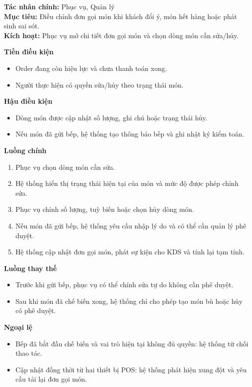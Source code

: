 \documentclass[11pt,a4paper]{article}
\begin{document}
    \begin{usecasebox}[title={UC-ORD-04 --- Sửa hoặc hủy dòng món}]
    \textbf{Tác nhân chính:} Phục vụ, Quản lý\\
    \textbf{Mục tiêu:} Điều chỉnh đơn gọi món khi khách đổi ý, món hết hàng hoặc phát sinh sai sót.\\
    \textbf{Kích hoạt:} Phục vụ mở chi tiết đơn gọi món và chọn dòng món cần sửa/hủy.

    \medskip
    \textbf{Tiền điều kiện}
    \begin{itemize}[leftmargin=1.8em]
  \item Order đang còn hiệu lực và chưa thanh toán xong.
  \item Người thực hiện có quyền sửa/hủy theo trạng thái món.
\end{itemize}

    \textbf{Hậu điều kiện}
    \begin{itemize}[leftmargin=1.8em]
  \item Dòng món được cập nhật số lượng, ghi chú hoặc trạng thái hủy.
  \item Nếu món đã gửi bếp, hệ thống tạo thông báo bếp và ghi nhật ký kiểm toán.
\end{itemize}

    \textbf{Luồng chính}
    \begin{enumerate}[leftmargin=1.8em]
  \item Phục vụ chọn dòng món cần sửa.
  \item Hệ thống hiển thị trạng thái hiện tại của món và mức độ được phép chỉnh sửa.
  \item Phục vụ chỉnh số lượng, tuỳ biến hoặc chọn hủy dòng món.
  \item Nếu món đã gửi bếp, hệ thống yêu cầu nhập lý do và có thể cần quản lý phê duyệt.
  \item Hệ thống cập nhật đơn gọi món, phát sự kiện cho KDS và tính lại tạm tính.
\end{enumerate}

    \textbf{Luồng thay thế}
    \begin{itemize}[leftmargin=1.8em]
  \item Trước khi gửi bếp, phục vụ có thể chỉnh sửa tự do không cần phê duyệt.
  \item Sau khi món đã chế biến xong, hệ thống chỉ cho phép tạo món bù hoặc hủy có phê duyệt.
\end{itemize}

    \textbf{Ngoại lệ}
    \begin{itemize}[leftmargin=1.8em]
  \item Bếp đã bắt đầu chế biến và vai trò hiện tại không đủ quyền: hệ thống từ chối thao tác.
  \item Cập nhật đồng thời từ hai thiết bị POS: hệ thống phát hiện xung đột và yêu cầu tải lại đơn gọi món.
\end{itemize}


\end{usecasebox}
\end{document}
